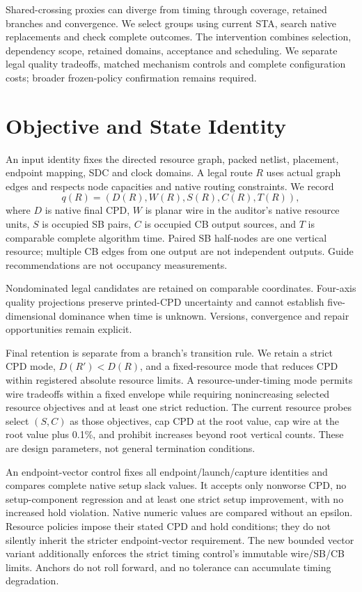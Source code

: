 \documentclass[conference,10pt]{IEEEtran}
\begin{document}
Shared-crossing proxies can diverge from timing through coverage, retained branches and convergence. We select groups using current STA, search native replacements and check complete outcomes. The intervention combines selection, dependency scope, retained domains, acceptance and scheduling. We separate legal quality tradeoffs, matched mechanism controls and complete configuration costs; broader frozen-policy confirmation remains required.

\section{Objective and State Identity}
An input identity fixes the directed resource graph, packed netlist, placement, endpoint mapping, SDC and clock domains. A legal route $R$ uses actual graph edges and respects node capacities and native routing constraints. We record
\begin{equation}
 q(R)=(D(R),W(R),S(R),C(R),T(R)),
\end{equation}
where $D$ is native final CPD, $W$ is planar wire in the auditor's native resource units, $S$ is occupied SB pairs, $C$ is occupied CB output sources, and $T$ is comparable complete algorithm time. Paired SB half-nodes are one vertical resource; multiple CB edges from one output are not independent outputs. Guide recommendations are not occupancy measurements.

Nondominated legal candidates are retained on comparable coordinates. Four-axis quality projections preserve printed-CPD uncertainty and cannot establish five-dimensional dominance when time is unknown. Versions, convergence and repair opportunities remain explicit.

Final retention is separate from a branch's transition rule. We retain a strict CPD mode, $D(R')<D(R)$, and a fixed-resource mode that reduces CPD within registered absolute resource limits. A resource-under-timing mode permits wire tradeoffs within a fixed envelope while requiring nonincreasing selected resource objectives and at least one strict reduction. The current resource probes select $(S,C)$ as those objectives, cap CPD at the root value, cap wire at the root value plus 0.1\%, and prohibit increases beyond root vertical counts. These are design parameters, not general termination conditions.

An endpoint-vector control fixes all endpoint/launch/capture identities and compares complete native setup slack values. It accepts only nonworse CPD, no setup-component regression and at least one strict setup improvement, with no increased hold violation. Native numeric values are compared without an epsilon. Resource policies impose their stated CPD and hold conditions; they do not silently inherit the stricter endpoint-vector requirement. The new bounded vector variant additionally enforces the strict timing control's immutable wire/SB/CB limits. Anchors do not roll forward, and no tolerance can accumulate timing degradation.
\end{document}
